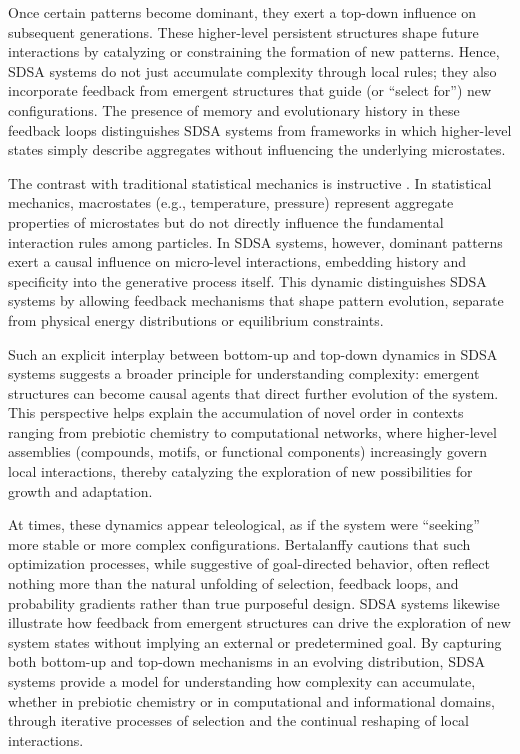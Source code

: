 \documentclass[preprint,12pt]{elsarticle}
\begin{document}
Once certain patterns become dominant, they exert a top-down influence on subsequent generations. These higher-level persistent structures shape future interactions by catalyzing or constraining the formation of new patterns. Hence, SDSA systems do not just accumulate complexity through local rules; they also incorporate feedback from emergent structures that guide (or ``select for'') new configurations. The presence of memory and evolutionary history in these feedback loops distinguishes SDSA systems from frameworks in which higher-level states simply describe aggregates without influencing the underlying microstates.

The contrast with traditional statistical mechanics is instructive \cite{landau1980statistical}. In statistical mechanics, macrostates (e.g., temperature, pressure) represent aggregate properties of microstates but do not directly influence the fundamental interaction rules among particles. In SDSA systems, however, dominant patterns exert a causal influence on micro-level interactions, embedding history and specificity into the generative process itself. This dynamic distinguishes SDSA systems by allowing feedback mechanisms that shape pattern evolution, separate from physical energy distributions or equilibrium constraints.

Such an explicit interplay between bottom-up and top-down dynamics in SDSA systems suggests a broader principle for understanding complexity: emergent structures can become causal agents that direct further evolution of the system. This perspective helps explain the accumulation of novel order in contexts ranging from prebiotic chemistry to computational networks, where higher-level assemblies (compounds, motifs, or functional components) increasingly govern local interactions, thereby catalyzing the exploration of new possibilities for growth and adaptation.

At times, these dynamics appear teleological, as if the system were ``seeking'' more stable or more complex configurations. Bertalanffy \cite{bertalanffy1968general} cautions that such optimization processes, while suggestive of goal-directed behavior, often reflect nothing more than the natural unfolding of selection, feedback loops, and probability gradients rather than true purposeful design. SDSA systems likewise illustrate how feedback from emergent structures can drive the exploration of new system states without implying an external or predetermined goal. By capturing both bottom-up and top-down mechanisms in an evolving distribution, SDSA systems provide a model for understanding how complexity can accumulate, whether in prebiotic chemistry or in computational and informational domains, through iterative processes of selection and the continual reshaping of local interactions.
\end{document}
